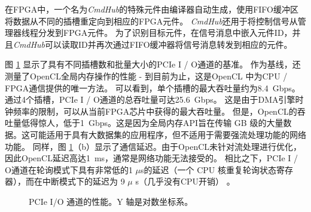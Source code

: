 在FPGA中，一个名为\textit {CmdHub}的特殊元件由\name 编译器自动生成，使用FIFO缓冲区将数据从不同的插槽重定向到相应的FPGA元件。
\textit {CmdHub}还用于将控制信号从管理器线程分发到FPGA元件。
为了识别目标元件，在信号消息中嵌入元件ID，并且\textit {CmdHub}可以读取ID并再次通过FIFO缓冲器将信号消息转发到相应的元件。

图 \ref {clicknp:fig:pcie} 显示了具有不同插槽数和批量大小的PCIe I / O通道的基准。
作为基线，还测量了OpenCL全局内存操作的性能 - 到目前为止，这是OpenCL \cite {opencl}中为CPU / FPGA通信提供的唯一方法。
可以看到，单个插槽的最大吞吐量约为8.4~Gbps。
通过4个插槽，PCIe I / O通道的总吞吐量可达25.6~Gbps。
这是由于DMA引擎时钟频率的限制，可以从当前FPGA芯片中获得的最大吞吐量。
但是，OpenCL的吞吐量低得惊人，低于1~Gbps。这是因为全局内存API旨在传输 GB 级的大量数据。这可能适用于具有大数据集的应用程序，但不适用于需要强流处理功能的网络功能。
同样，图 \ref {clicknp:fig:pcie}（b）显示了通信延迟。由于OpenCL未针对流处理进行优化，因此OpenCL延迟高达1~ms，通常是网络功能无法接受的。
相比之下，PCIe I / O通道在轮询模式下具有非常低的1 $\mu$s的延迟（一个 CPU 核重复轮询状态寄存器），而在中断模式下的延迟为 9 $\mu$ s（几乎没有CPU开销） 。

\begin{figure}[htbp]
	\centering

	\caption{PCIe I/O 通道的性能。Y 轴是对数坐标系。}

	\label{clicknp:fig:pcie}
\end{figure}

